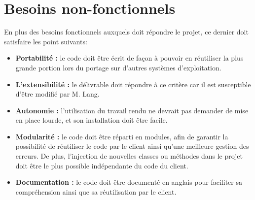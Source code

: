 \section{Besoins non-fonctionnels}
En plus des besoins fonctionnels auxquels doit répondre le projet, ce dernier doit satisfaire les point suivants:\\
\begin{itemize}
\item[\textbullet] \textbf{Portabilité :} le code doit être écrit de façon à pouvoir en réutiliser la plus grande portion lors du portage sur d'autres systèmes d'exploitation.\\
\item[\textbullet] \textbf{L'extensibilité :} le délivrable doit répondre à ce critère car il est susceptible d'être modifié par M. Lang.\\
\item[\textbullet] \textbf{Autonomie :} l'utilisation du travail rendu ne devrait pas demander de mise en place lourde, et son installation doit être facile.\\
\item[\textbullet] \textbf{ Modularité :} le code doit être réparti en modules, afin de garantir la possibilité de réutiliser le code par le client ainsi qu'une meilleure gestion des erreurs. De plus, l'injection de nouvelles classes ou méthodes dans le projet doit être le plus possible indépendante du code du client.\\
\item[\textbullet] \textbf{ Documentation :} le code doit être documenté en anglais pour faciliter sa compréhension ainsi que sa réutilisation par le client.\\

\end{itemize}


